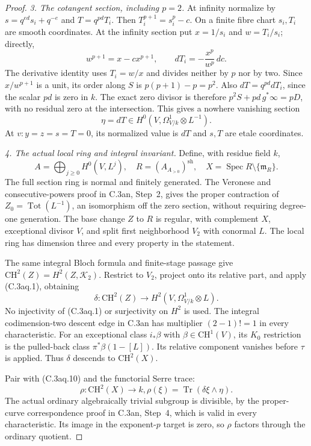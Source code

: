 \begin{proof}
\emph{3. The cotangent section, including $p=2$.}
At infinity normalize by
$s=q^{ed}s_i+q^{-e}$ and $T=q^{pd}T_i$.
Then $T_i^{p+1}=s_i^p-c$. On a finite fibre chart
$s_i,T_i$ are smooth coordinates. At the infinity
section put $x=1/s_i$ and $w=T_i/s_i$; directly,
\[
             w^{p+1}=x-cx^{p+1},\qquad
             dT_i=-\frac{x^p}{w^p}\,dc.
                                                        \tag{C.3aq.9}
\]
The derivative identity uses $T_i=w/x$ and divides
neither by $p$ nor by two. Since $x/w^{p+1}$ is a
unit, its order along $S$ is $p(p+1)-p=p^2$.
Also $dT=q^{pd}dT_i$, since the scalar $pd$ is zero
in $k$. The exact zero divisor is therefore
$p^2S+pd\,g^*\infty=pD$, with no residual zero at
the intersection. This gives a nowhere vanishing section
\[
                 \eta=dT\in H^0(V,\Omega^1_{V/k}\otimes L^{-1}).
                                                        \tag{C.3aq.10}
\]
At $v:y=z=s=T=0$, its normalized value is $dT$
and $s,T$ are etale coordinates.

\emph{4. The actual local ring and integral invariant.}
Define, with residue field $k$,
\[
 A=\bigoplus_{j\ge0}H^0(V,L^j),\quad
 R=(A_{A_{>0}})^{\mathrm{sh}},\quad
 X=\operatorname{Spec}R\setminus\{\mathfrak m_R\}.
                                                        \tag{C.3aq.11}
\]
The full section ring is normal and finitely generated.
The Veronese and consecutive-powers proof in C.3an,
Step~2, gives the proper contraction of
$Z_0=\operatorname{Tot}(L^{-1})$, an isomorphism off
the zero section, without requiring degree-one generation.
The base change $Z$ to $R$ is regular, with complement
$X$, exceptional divisor $V$, and split first neighborhood
$V_2$ with conormal $L$. The local ring has dimension three
and every property in the statement.

The same integral Bloch formula and finite-stage passage
give $\mathrm{CH}^2(Z)=H^2(Z,\mathcal K_2)$.
Restrict to $V_2$, project onto its relative part, and
apply (C.3aq.1), obtaining
\[
 \delta:\mathrm{CH}^2(Z)\longrightarrow
                               H^2(V,\Omega^1_{V/k}\otimes L).
\]
No injectivity of (C.3aq.1) or surjectivity on $H^2$
is used. The integral codimension-two descent edge in
C.3an has multiplier $(2-1)!=1$ in every characteristic.
For an exceptional class $i_*\beta$ with
$\beta\in\mathrm{CH}^1(V)$, its $K_0$ restriction is
the pulled-back class $\pi^*\beta(1-[L])$. Its relative
component vanishes before $\tau$ is applied. Thus
$\delta$ descends to $\mathrm{CH}^2(X)$.

Pair with (C.3aq.10) and the functorial Serre trace:
\[
 \rho:\mathrm{CH}^2(X)\longrightarrow k,
                   \rho(\xi)=\operatorname{Tr}(\delta\xi\wedge\eta).
                                                        \tag{C.3aq.12}
\]
The actual ordinary algebraically trivial subgroup is
divisible, by the proper-curve correspondence proof in
C.3an, Step~4, which is valid in every characteristic.
Its image in the exponent-$p$ target is zero, so $\rho$
factors through the ordinary quotient.


\end{proof}
